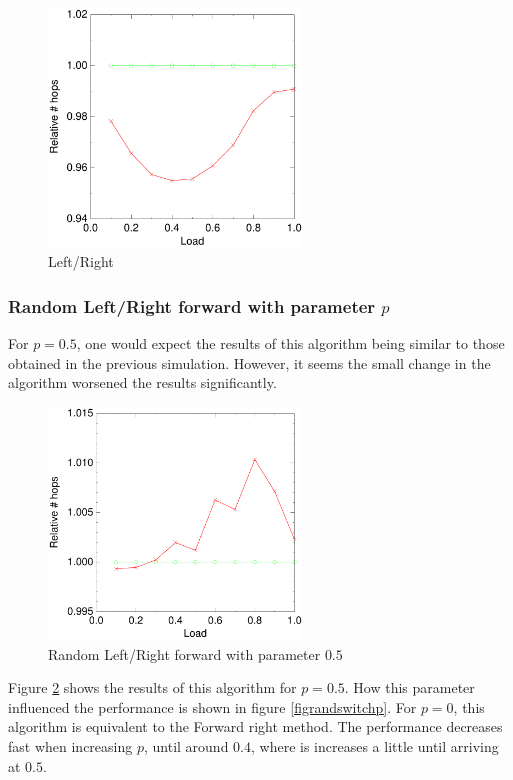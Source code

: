 \documentclass[10pt,a4paper]{article}
\begin{document}
\begin{figure}[h!tb]
\centering
\includegraphics[width=0.6\textwidth]{data/switchright.pdf}
\caption{Left/Right}
\label{figlr}
\end{figure}


\subsubsection*{Random Left/Right forward with parameter $p$}
For $p=0.5$, one would expect the results of this algorithm being similar to those obtained in the previous simulation. However, it seems the small change in the algorithm worsened the results significantly.

\begin{figure}[h!tb]
\centering
\includegraphics[width=0.6\textwidth]{data/randswitchright.pdf}
\caption{Random Left/Right forward with parameter $0.5$}
\label{figrandswitch}
\end{figure}

Figure \ref{figrandswitch} shows the results of this algorithm for $p=0.5$. How this parameter influenced the performance is shown in figure \ref{figrandswitchp}. For $p=0$, this algorithm is equivalent to the Forward right method. The performance decreases fast when increasing $p$, until around $0.4$, where is increases a little until arriving at $0.5$.
\end{document}
